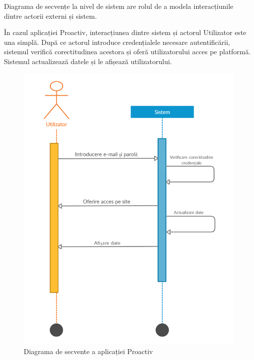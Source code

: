 \documentclass[12pt,a4paper]{report}
\begin{document}
\par
Diagrama de secvențe la nivel de sistem are rolul de a modela interacțiunile dintre actorii externi și sistem.
\\
\par
În cazul aplicației Proactiv, interacțiunea dintre sistem și actorul Utilizator este una simplă. După ce actorul introduce credențialele necesare autentificării, sistemul verifică corectitudinea acestora și oferă utilizatorului acces pe platformă. Sistemul actualizează datele și le afișează utilizatorului.
\\
\begin{figure}[h]
\centering
  \includegraphics[width=0.6\linewidth]{./imagini/Sequence.jpg}
  \caption{Diagrama de secvente a aplicației Proactiv}
\end{figure}


\newpage
\end{document}
